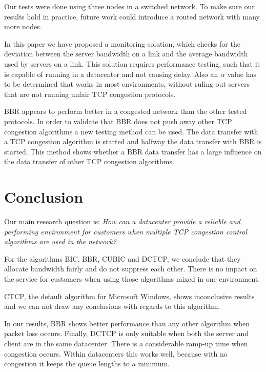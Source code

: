 \documentclass{article}
\begin{document}
Our tests were done using three nodes in a switched network. To make sure our
results hold in practice, future work could introduce a routed network with
many more nodes.

In this paper we have proposed a monitoring solution, which checks for the deviation between the server bandwidth on a link and the average bandwidth used by servers on a link. This solution requires performance testing, such that it is capable of running in a datacenter and not causing delay. Also an $\alpha$ value has to be determined that works in most environments, without ruling out servers that are not running unfair TCP congestion protocols.

BBR appears to perform better in a congested network than the other tested protocols. In order to validate that BBR does not push away other TCP congestion algorithms a new testing method can be used. The data transfer with a TCP congestion algorithm is started and halfway the data transfer with BBR is started. This method shows whether a BBR data transfer has a large influence on the data transfer of other TCP congestion algorithms.

\section{Conclusion}\label{sec:conclusion}

Our main research question is: {\it How can a datacenter provide a reliable and performing environment for customers when multiple TCP congestion control algorithms are used in the network?} 

For the algorithms BIC, BBR, CUBIC and DCTCP, we conclude that they allocate
bandwidth fairly and do not suppress each other. There is no impact on the
service for customers when using those algorithms mixed in one environment.

CTCP, the default algorithm for Microsoft Windows, shows inconclusive results
and we can not draw any conclusions with regards to this algorithm.

In our results, BBR shows better performance than any other algorithm when
packet loss occurs. Finally, DCTCP is only suitable when both the server and
client are in the same datacenter. There is a considerable ramp-up time when
congestion occurs. Within datacenters this works well, because with no
congestion it keeps the queue lengths to a minimum.

\printbibliography
\end{document}
